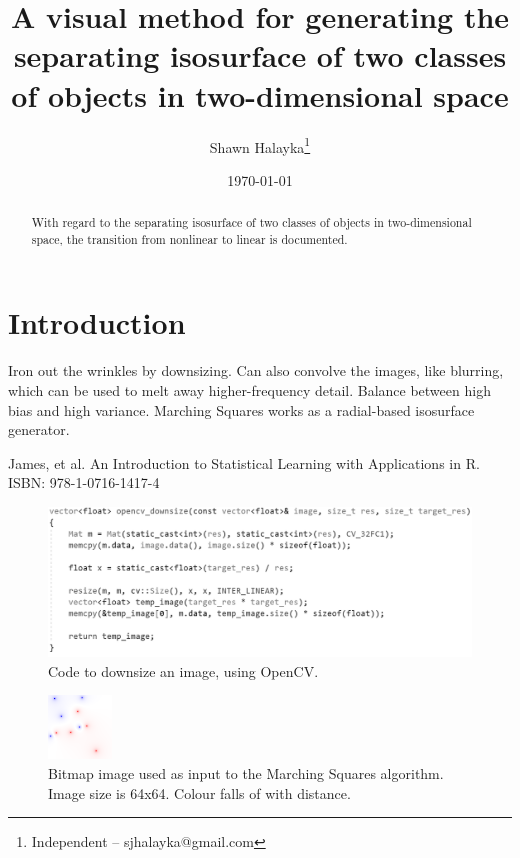 \documentclass[12pt]{article}
\title{A visual method for generating the separating isosurface of two classes of objects in two-dimensional space}
\author{
Shawn Halayka\footnote{Independent -- sjhalayka@gmail.com}
}
\date{\today\;\currenttime}
\begin{document}
\maketitle

\begin{abstract}
With regard to the separating isosurface of two classes of objects in two-dimensional space, the transition from nonlinear to linear is documented.
\end{abstract}




\section{Introduction}

Iron out the wrinkles by downsizing.
Can also convolve the images, like blurring, which can be used to melt away higher-frequency detail.
Balance between high bias and high variance.
Marching Squares works as a radial-based isosurface generator.





\begin{thebibliography}{9}

 James, et al. An Introduction to Statistical Learning with Applications in R. ISBN: 978-1-0716-1417-4

\end{thebibliography}






\begin{figure} 
\centering
  \includegraphics[width = 4 in]{downsize_code.png}
  \caption{Code to downsize an image, using OpenCV.
}
\end{figure}




\begin{figure} 
\centering
  \includegraphics[width = 3 in]{64_res_image.png}
  \caption{Bitmap image used as input to the Marching Squares algorithm. 
Image size is 64x64.
Colour falls of with distance.
}
\end{figure}
\end{document}
